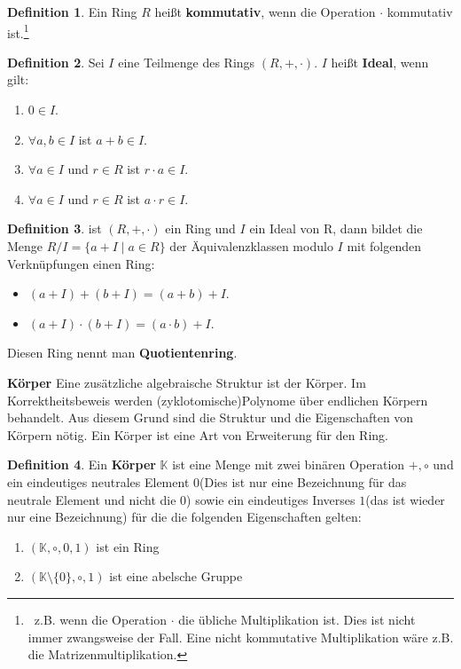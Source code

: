 \documentclass[12pt,oneside]{article}
\theoremstyle{remark}
\theoremstyle{definition}
\newtheorem{definition}{Definition}[section]
\begin{document}
\smallskip

\begin{definition}
Ein Ring $R$ heißt \textbf{kommutativ}, wenn die Operation $\cdot$ kommutativ ist.\footnote{ $\,$ z.B. wenn die Operation $\cdot$ die übliche Multiplikation ist. Dies ist nicht immer zwangsweise der Fall. Eine nicht kommutative Multiplikation wäre z.B. die Matrizenmultiplikation.}
\end{definition}

\smallskip




\smallskip


\begin{definition}
Sei $I$ eine Teilmenge des Rings $(R,+,\cdot)$. $I$ heißt \textbf{Ideal}, wenn gilt:
\begin{enumerate}
    \item $0 \in I$.
    \item $\forall a,b \in I$ ist $a + b \in I$.
    \item $\forall a \in I$ und $r \in R$ ist $r \cdot a \in I$.
    \item $\forall a \in I$ und $r \in R$ ist $a \cdot r \in I$.
\end{enumerate}
\end{definition}

\smallskip 

\begin{definition}
ist $(R, +, \cdot)$ ein Ring und $I$ ein Ideal von R, dann bildet die Menge $R/I = \{ a + I \mid a \in R\}$ der Äquivalenzklassen modulo $I$ mit folgenden Verknüpfungen einen Ring:
\begin{itemize}
    \item $(a + I) + (b + I) = (a + b) + I$.
    \item $(a + I) \cdot (b + I) = (a \cdot b ) + I$.\newline
\end{itemize}
Diesen Ring nennt man \textbf{Quotientenring}. 
\end{definition}

\smallskip

\textbf{Körper}\newline
Eine zusätzliche algebraische Struktur ist der Körper. Im Korrektheitsbeweis werden (zyklotomische)Polynome über endlichen Körpern behandelt. Aus diesem Grund sind die Struktur und die Eigenschaften von Körpern nötig. Ein Körper ist eine Art von Erweiterung für den Ring.

\begin{definition}
Ein \textbf{Körper} $\mathbb{K}$ ist eine Menge mit zwei binären Operation $+,\circ$ und ein eindeutiges neutrales Element $0$(Dies ist nur eine Bezeichnung für das neutrale Element und nicht die 0) sowie ein eindeutiges Inverses $1$(das ist wieder nur eine Bezeichnung) für die die folgenden Eigenschaften gelten:
\begin{enumerate}
    \item $(\mathbb{K},\circ,0,1)$ ist ein Ring
    
    \item $(\mathbb{K}\setminus \{ 0\}, \circ,1)$ ist eine abelsche Gruppe 
\end{enumerate}
\end{definition}
\end{document}
